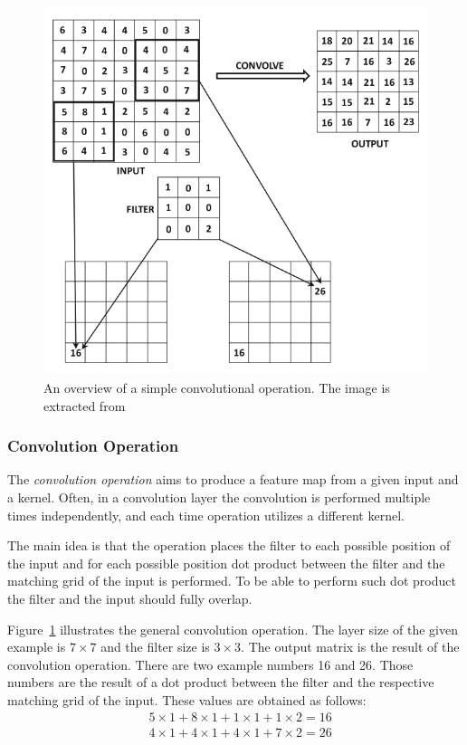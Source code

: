 \begin{figure}[t]
\centering
 \includegraphics[width=\linewidth]{Figures/fig_cnn_convolution.png}
 \caption{An overview of a simple convolutional operation. The image is extracted from~\cite{DBLP:books/sp/Aggarwal18}}
 \label{fig:cnn_convolution}
\end{figure}

\subsubsection{Convolution Operation}


The \textit{convolution operation} aims to produce a feature map from a given input and a kernel. Often, in a convolution layer the convolution is performed multiple times independently, and each time operation utilizes a different kernel.  

 The main idea is that the operation places the filter to each possible position of the input %
and for each possible position dot product between the filter and the matching grid of the input is performed. To be able to perform such dot product the filter and the input should fully overlap.

Figure~\ref{fig:cnn_convolution} illustrates the general convolution operation. The layer size of the given example is $7\times7$ and the filter size is $3\times3$. The output matrix is the result of the convolution operation. There are two example numbers 16 and 26. Those numbers are the result of a dot product between the filter and the respective matching grid of the input. These values are obtained as follows:
\begin{align*}
& 5\times1+8\times1+1\times1+1\times2=16 \\
& 4\times1+4\times1+4\times1+7\times2=26
\end{align*}

